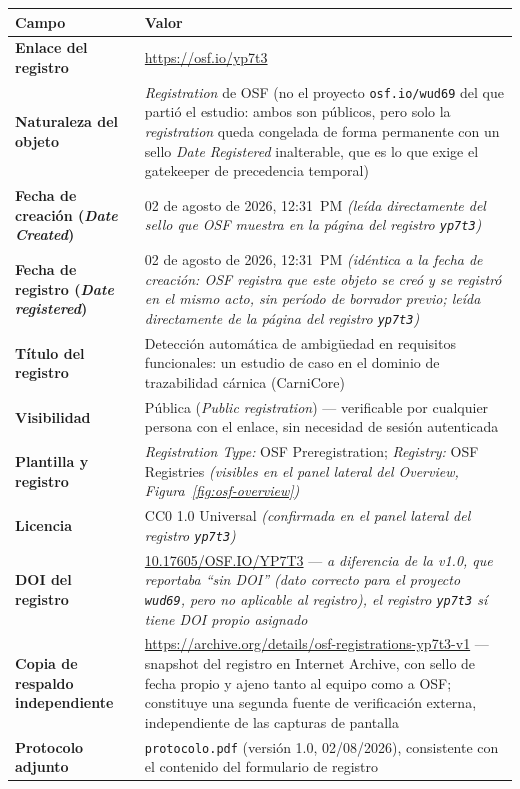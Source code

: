 \documentclass[11pt,a4paper]{article}
\begin{document}
\renewcommand{\arraystretch}{1.4}
\begin{longtable}{@{}>{\bfseries}p{4.2cm} p{10.8cm}@{}}
\toprule
\rowcolor{griscelda}
Campo & Valor \\
\midrule
\endhead

Enlace del registro & \url{https://osf.io/yp7t3} \\
Naturaleza del objeto & \textit{Registration} de OSF (no el proyecto
\texttt{osf.io/wud69} del que partió el estudio: ambos son públicos, pero solo
la \textit{registration} queda congelada de forma permanente con un sello
\textit{Date Registered} inalterable, que es lo que exige el gatekeeper de
precedencia temporal) \\
Fecha de creación (\textit{Date Created}) &
02 de agosto de 2026, 12:31~PM \textit{(leída directamente del sello que OSF
muestra en la página del registro \texttt{yp7t3})} \\
Fecha de registro (\textit{Date registered}) &
02 de agosto de 2026, 12:31~PM \textit{(idéntica a la fecha de creación: OSF
registra que este objeto se creó y se registró en el mismo acto, sin período de
borrador previo; leída directamente de la página del registro \texttt{yp7t3})} \\
Título del registro &
Detección automática de ambigüedad en requisitos funcionales: un estudio de caso
en el dominio de trazabilidad cárnica (CarniCore) \\
Visibilidad & Pública (\textit{Public registration}) --- verificable por
cualquier persona con el enlace, sin necesidad de sesión autenticada \\
Plantilla y registro &
\textit{Registration Type:} OSF Preregistration; \textit{Registry:} OSF
Registries \textit{(visibles en el panel lateral del Overview, Figura~\ref{fig:osf-overview})} \\
Licencia & CC0 1.0 Universal \textit{(confirmada en el panel lateral del
registro \texttt{yp7t3})} \\
DOI del registro &
\href{https://doi.org/10.17605/OSF.IO/YP7T3}{10.17605/OSF.IO/YP7T3} ---
\textit{a diferencia de la v1.0, que reportaba ``sin DOI'' (dato correcto para
el proyecto \texttt{wud69}, pero no aplicable al registro), el registro
\texttt{yp7t3} sí tiene DOI propio asignado} \\
Copia de respaldo independiente &
\url{https://archive.org/details/osf-registrations-yp7t3-v1} --- snapshot del
registro en Internet Archive, con sello de fecha propio y ajeno tanto al
equipo como a OSF; constituye una segunda fuente de verificación externa,
independiente de las capturas de pantalla \\
Protocolo adjunto &
\texttt{protocolo.pdf} (versión 1.0, 02/08/2026), consistente con el contenido del
formulario de registro \\
\bottomrule
\end{longtable}
\end{document}
